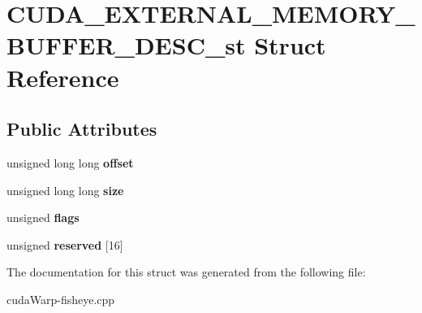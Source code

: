 \hypertarget{structCUDA__EXTERNAL__MEMORY__BUFFER__DESC__st}{}\section{C\+U\+D\+A\+\_\+\+E\+X\+T\+E\+R\+N\+A\+L\+\_\+\+M\+E\+M\+O\+R\+Y\+\_\+\+B\+U\+F\+F\+E\+R\+\_\+\+D\+E\+S\+C\+\_\+st Struct Reference}
\label{structCUDA__EXTERNAL__MEMORY__BUFFER__DESC__st}
\subsection*{Public Attributes}
\begin{DoxyCompactItemize}
\item 
unsigned long long {\bfseries offset}\hypertarget{structCUDA__EXTERNAL__MEMORY__BUFFER__DESC__st_a916ea63a1317546cb6da46d671605dbe}{}\label{structCUDA__EXTERNAL__MEMORY__BUFFER__DESC__st_a916ea63a1317546cb6da46d671605dbe}

\item 
unsigned long long {\bfseries size}\hypertarget{structCUDA__EXTERNAL__MEMORY__BUFFER__DESC__st_a11bb1b657e05c4a4672675c34ff799c3}{}\label{structCUDA__EXTERNAL__MEMORY__BUFFER__DESC__st_a11bb1b657e05c4a4672675c34ff799c3}

\item 
unsigned {\bfseries flags}\hypertarget{structCUDA__EXTERNAL__MEMORY__BUFFER__DESC__st_ad7c926c211a9f7d7a2323a5687ea032b}{}\label{structCUDA__EXTERNAL__MEMORY__BUFFER__DESC__st_ad7c926c211a9f7d7a2323a5687ea032b}

\item 
unsigned {\bfseries reserved} \mbox{[}16\mbox{]}\hypertarget{structCUDA__EXTERNAL__MEMORY__BUFFER__DESC__st_a884fbf9719f3db92434fb5e9769bbb05}{}\label{structCUDA__EXTERNAL__MEMORY__BUFFER__DESC__st_a884fbf9719f3db92434fb5e9769bbb05}

\end{DoxyCompactItemize}


The documentation for this struct was generated from the following file\+:\begin{DoxyCompactItemize}
\item 
cuda\+Warp-\/fisheye.\+cpp\end{DoxyCompactItemize}
